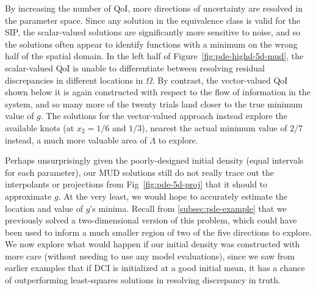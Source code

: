By increasing the number of QoI, more directions of uncertainty are resolved in the parameter space.
Since any solution in the equivalence class is valid for the SIP, the scalar-valued solutions are significantly more sensitive to noise, and so the solutions often appear to identify functions with a minimum on the wrong half of the spatial domain.
In the left half of Figure~\ref{fig:pde-highd-5d-mud}, the scalar-valued QoI is unable to differentiate between resolving residual discrepancies in different locations in $\Omega$.
By contrast, the vector-valued QoI shown below it is again constructed with respect to the flow of information in the system, and so many more of the twenty trials land closer to the true minimum value of $g$.
The solutions for the vector-valued approach instead explore the available knots (at $x_2=1/6$ and $1/3$), nearest the actual minimum value of $2/7$ instead, a much more valuable area of $\Lambda$ to explore.

Perhaps unsurprisingly given the poorly-designed initial density (equal intervals for each parameter), our MUD solutions still do not really trace out the interpolants or projections from Fig~\ref{fig:pde-5d-proj} that it should to approximate $g$.
At the very least, we would hope to accurately estimate the location and value of $g$'s minima.
Recall from \ref{subsec:pde-example} that we previously solved a two-dimensional version of this problem, which could have been used to inform a much smaller region of two of the five directions to explore.
We now explore what would happen if our initial density was constructed with more care (without needing to use any model evaluations), since we saw from earlier examples that if DCI is initialized at a good initial mean, it has a chance of outperforming least-squares solutions in resolving discrepancy in truth.
